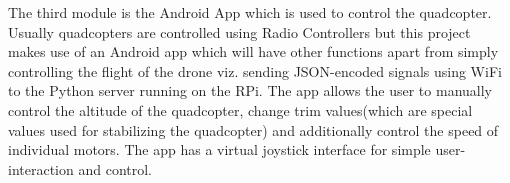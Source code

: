 \linebreak
The third module is the Android App which is used to control the quadcopter. Usually quadcopters are controlled using Radio Controllers but this project makes use of an Android app which will have other functions apart from simply controlling the flight of the drone viz. sending JSON-encoded signals using WiFi to the Python server running on the RPi. The app allows the user to manually control the altitude of the quadcopter, change trim values(which are special values used for stabilizing the quadcopter) and additionally control the speed of individual motors. The app has a virtual joystick interface for simple user-interaction and control.
